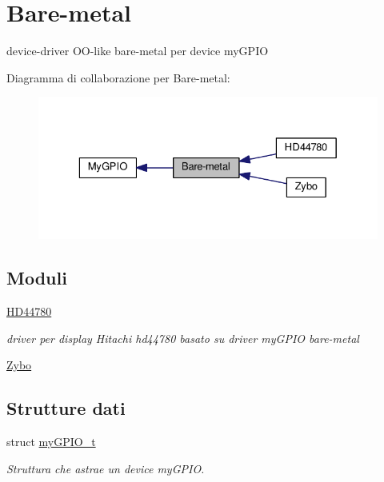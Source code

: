 \hypertarget{group__bare-metal}{\section{Bare-\/metal}
\label{group__bare-metal}
}


device-\/driver O\+O-\/like bare-\/metal per device my\+G\+P\+I\+O  


Diagramma di collaborazione per Bare-\/metal\+:\nopagebreak
\begin{figure}[H]
\begin{center}
\leavevmode
\includegraphics[width=329pt]{group__bare-metal}
\end{center}
\end{figure}
\subsection*{Moduli}
\begin{DoxyCompactItemize}
\item 
\hyperlink{group___h_d44780}{H\+D44780}
\begin{DoxyCompactList}\small\item\em driver per display Hitachi hd44780 basato su driver my\+G\+P\+I\+O bare-\/metal \end{DoxyCompactList}\item 
\hyperlink{group___zybo}{Zybo}
\end{DoxyCompactItemize}
\subsection*{Strutture dati}
\begin{DoxyCompactItemize}
\item 
struct \hyperlink{structmy_g_p_i_o__t}{my\+G\+P\+I\+O\+\_\+t}
\begin{DoxyCompactList}\small\item\em Struttura che astrae un device my\+G\+P\+I\+O. \end{DoxyCompactList}\end{DoxyCompactItemize}
